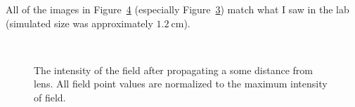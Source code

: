 \documentclass[12pt,a4paper]{article}
\begin{document}
All of the images in Figure~\ref{fig:task4} (especially Figure~\ref{fig:task4_3}) match what I saw in the lab (simulated size was approximately $\SI{1.2}{\centi\metre}$).

\begin{figure}
  \centering
    \begin{subfigure}[b]{0.49\textwidth}
        \noindent\makebox[\textwidth]{\scalebox{0.40}{}}
        \label{fig:task4_1}
    \end{subfigure}  
    \begin{subfigure}[b]{0.49\textwidth}
        \noindent\makebox[\textwidth]{\scalebox{0.40}{}}
        \label{fig:task4_2}
    \end{subfigure}\\
    \begin{subfigure}[b]{0.75\textwidth}
        \noindent\makebox[\textwidth]{\scalebox{0.75}{}}
        \label{fig:task4_3}
    \end{subfigure}  
  \caption{The intensity of the field after propagating a some distance from lens. All field point values are normalized to the maximum intensity of field.}
  \label{fig:task4}
\end{figure}
\end{document}
